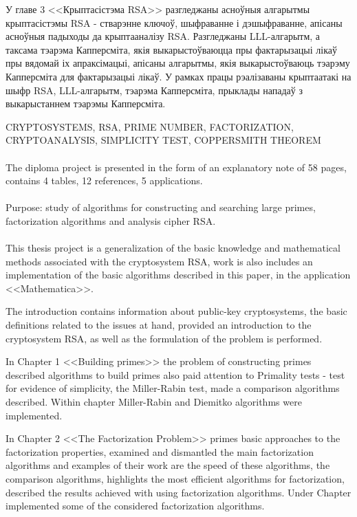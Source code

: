 У главе 3 <<Крыптасістэма RSA>> разгледжаны асноўныя алгарытмы крыптасістэмы RSA - стварэнне ключоў, шыфраванне і дэшыфраванне, апісаны асноўныя
падыходы да крыптааналізу RSA. Разгледжаны LLL-алгарытм, а таксама тэарэма Капперсміта, якія выкарыстоўваюцца пры фактарызацыі лікаў пры вядомай іх
апраксімацыі, апісаны алгарытмы, якія выкарыстоўваюць тэарэму Капперсміта для фактарызацыі лікаў. У рамках працы рэалізаваны крыптаатакі на шыфр RSA, LLL-алгарытм, тэарэма Капперсміта, прыклады нападаў з выкарыстаннем тэарэмы Капперсміта.

\newpage

CRYPTOSYSTEMS, RSA, PRIME NUMBER, FACTORIZATION, CRYPTO\-ANALYSIS, SIMPLICITY TEST, COPPERSMITH THEOREM

\paragraph{} The diploma project is presented in the form of an explanatory note of 58 pages, contains 4 tables, 12 references, 5 applications.

\paragraph{} Purpose: study of algorithms for constructing and searching large primes, factori\-zation algorithms and analysis cipher RSA.

\paragraph{} This thesis project is a generalization of the basic knowledge and mathematical methods associated with the cryptosystem RSA, work is also
includes an implemen\-tation of the basic algorithms described in this paper, in the application <<Mathema\-tica>>.

The introduction contains information about public-key cryptosystems, the basic definitions related to the issues at hand,
provided an introduction to the cryptosystem RSA, as well as the formulation of the problem is performed.

In Chapter 1 <<Building primes>> the problem of constructing primes described algorithms to build primes
also paid attention to Primality tests - test for evidence of simplicity, the Miller-Rabin test, made ​​a comparison algorithms described. Within
chapter Miller-Rabin and Diemitko algorithms were implemented.

In Chapter 2 <<The Factorization Problem>> primes basic approaches to the factorization properties, examined and dismantled the main factorization algorithms and examples of their work are the speed of these algorithms, the comparison algorithms, highlights the most efficient algorithms for factorization, described the results achieved with using factorization algorithms. Under Chapter implemented some of the considered factorization algorithms.

